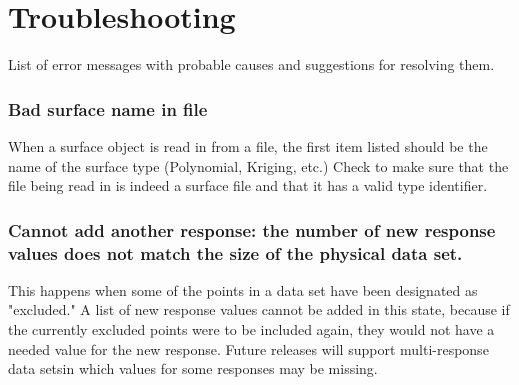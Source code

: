 \documentclass{article}
\begin{document}
%
%
%
%
\section{Troubleshooting}\label{sec:troubleshooting}
List of error messages with probable causes and suggestions for resolving them.

\subsubsection{Bad surface name in file}
When a surface object is read in from a file, the first item listed should be
the name of the surface type (Polynomial, Kriging, etc.) Check to make sure that
the file being read in is indeed a surface file and that it has a valid type
identifier.

\subsubsection{Cannot add another response: the number of new response values does not match the size of the physical data set.}
This happens when some of the points in a data set have been designated as
"excluded."  A list of new response values cannot be added in this state,
because if the currently excluded points were to be included again, they would
not have a needed value for the new response.  Future releases will support
multi-response data setsin which values for some responses may be missing.
\end{document}
